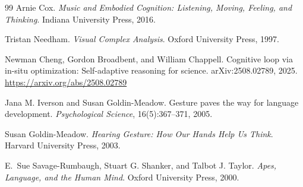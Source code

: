 \documentclass[11pt, a4paper]{article}
\begin{document}
\begin{thebibliography}{99}
Arnie Cox.
\newblock \emph{Music and Embodied Cognition: Listening, Moving, Feeling, and
  Thinking}.
\newblock Indiana University Press, 2016.

Tristan Needham.
\newblock \emph{Visual Complex Analysis}.
\newblock Oxford University Press, 1997.

Newman Cheng, Gordon Broadbent, and William Chappell.
\newblock Cognitive loop via in-situ optimization: Self-adaptive reasoning for
  science.
\newblock arXiv:2508.02789, 2025.
\newblock \url{https://arxiv.org/abs/2508.02789}

Jana M. Iverson and Susan Goldin-Meadow.
\newblock Gesture paves the way for language development.
\newblock \emph{Psychological Science}, 16(5):367--371, 2005.

Susan Goldin-Meadow.
\newblock \emph{Hearing Gesture: How Our Hands Help Us Think}.
\newblock Harvard University Press, 2003.

E.~Sue Savage-Rumbaugh, Stuart G. Shanker, and Talbot J. Taylor.
\newblock \emph{Apes, Language, and the Human Mind}.
\newblock Oxford University Press, 2000.

\end{thebibliography}
\end{document}
